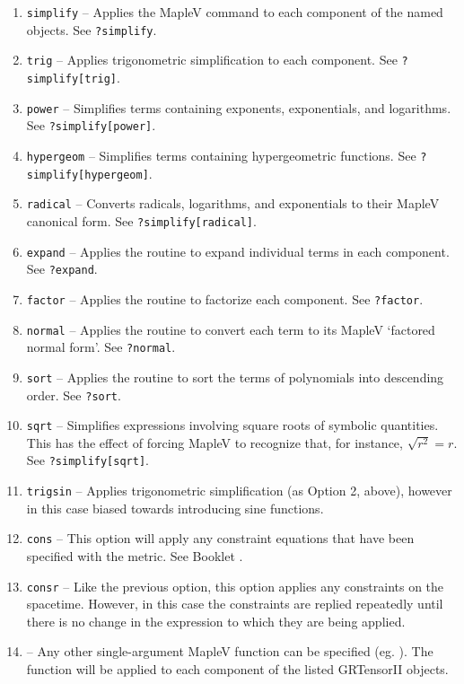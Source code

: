 \documentclass{article}
\begin{document}
{{{\begin{enumerate}
  \item \texttt{simplify} -- Applies the MapleV  command to
    each component of the named objects. See \texttt{?simplify}.
  \item \texttt{trig} -- Applies trigonometric simplification to each
    component. See \texttt{?simplify[trig]}.
  \item \texttt{power} -- Simplifies terms containing exponents, exponentials,
    and logarithms. See \texttt{?simplify[power]}.
  \item \texttt{hypergeom} -- Simplifies terms containing hypergeometric
    functions. See \texttt{?simplify[hypergeom]}.
  \item \texttt{radical} -- Converts radicals, logarithms, and exponentials
    to their MapleV canonical form. See \texttt{?simplify[radical]}.
  \item \texttt{expand} -- Applies the routine  to expand
    individual terms in each component. See \texttt{?expand}.
  \item \texttt{factor} -- Applies the routine  to factorize
    each component. See \texttt{?factor}.
  \item \texttt{normal} -- Applies the routine  to convert each
    term to its MapleV `factored normal form'. See \texttt{?normal}.
  \item \texttt{sort} -- Applies the routine  to sort the terms
    of polynomials into descending order. See \texttt{?sort}.
  \item \texttt{sqrt} -- Simplifies expressions involving square roots of
    symbolic quantities. This has the effect of forcing MapleV to recognize
    that, for instance, $\sqrt{r^2} = r$. See \texttt{?simplify[sqrt]}.
  \item \texttt{trigsin} -- Applies trigonometric simplification (as Option 2,
    above), however in this case biased towards introducing sine functions.
  \item \texttt{cons} -- This option will apply any constraint equations that
    have been specified with the metric. See Booklet \grMakegRef.
  \item \texttt{consr} -- Like the previous option, this option applies
    any constraints on the spacetime. However, in this case the constraints
    are replied repeatedly until there is no change in the expression to
    which they are being applied.   
  \item {} -- Any other single-argument MapleV function can be
    specified (eg. ). The function will be applied to each
    component of the listed GRTensorII objects.
\end{enumerate}

}}}
\end{document}
